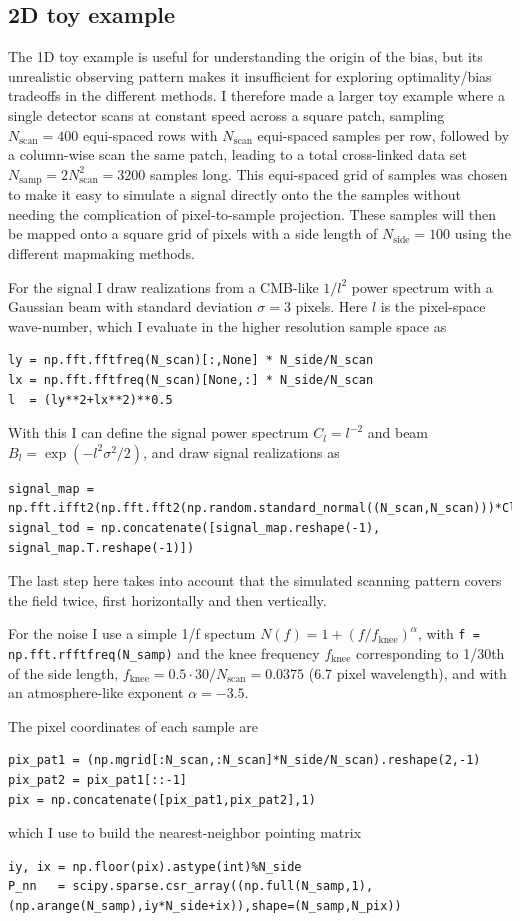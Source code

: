 \documentclass[twocolumn,apj]{aastex63}
\begin{document}
\subsection{2D toy example}
\label{sec:toy-2d}
The 1D toy example is useful for understanding the origin of the bias, but
its unrealistic observing pattern makes it insufficient for exploring
optimality/bias tradeoffs in the different methods. I therefore made a larger
toy example where a single detector scans at constant speed across a square
patch, sampling $N_\text{scan} = 400$ equi-spaced rows with $N_\text{scan}$
equi-spaced samples per row, followed by a column-wise scan the same patch,
leading to a total cross-linked data set $N_\text{samp} = 2 N_\text{scan}^2 = 3200$
samples long. This equi-spaced grid of samples was chosen to make it easy to
simulate a signal directly onto the the samples without needing the complication
of pixel-to-sample projection. These samples will then be mapped onto a
square grid of pixels with a side length of $N_\text{side} = 100$ using
the different mapmaking methods.

For the signal I draw realizations from a CMB-like $1/l^2$ power spectrum
with a Gaussian beam with standard deviation $\sigma=3$ pixels. Here $l$
is the pixel-space wave-number, which I evaluate in the higher
resolution sample space as
\begin{lstlisting}
ly = np.fft.fftfreq(N_scan)[:,None] * N_side/N_scan
lx = np.fft.fftfreq(N_scan)[None,:] * N_side/N_scan
l  = (ly**2+lx**2)**0.5
\end{lstlisting}
With this I can define the signal power spectrum $C_l = l^{-2}$ and beam $B_l = \exp(-l^2 \sigma^2/2)$,
and draw signal realizations as
\begin{lstlisting}
signal_map = np.fft.ifft2(np.fft.fft2(np.random.standard_normal((N_scan,N_scan)))*Cl**0.5*Bl).real
signal_tod = np.concatenate([signal_map.reshape(-1), signal_map.T.reshape(-1)])
\end{lstlisting}
The last step here takes into account that the simulated scanning pattern covers the
field twice, first horizontally and then vertically.

For the noise I use a simple 1/f spectum $N(f) = 1 + (f/f_\text{knee})^\alpha$,
with \lstinline{f = np.fft.rfftfreq(N_samp)}
and the knee frequency $f_\text{knee}$ corresponding to 1/30th of the side length,
$f_\text{knee} = 0.5\cdot 30/N_\text{scan} = 0.0375$ (6.7 pixel wavelength), and with
an atmosphere-like exponent $\alpha=-3.5$.

The pixel coordinates of each sample are
\begin{lstlisting}
pix_pat1 = (np.mgrid[:N_scan,:N_scan]*N_side/N_scan).reshape(2,-1)
pix_pat2 = pix_pat1[::-1]
pix = np.concatenate([pix_pat1,pix_pat2],1)
\end{lstlisting}
which I use to build the nearest-neighbor pointing matrix
\begin{lstlisting}
iy, ix = np.floor(pix).astype(int)%N_side
P_nn   = scipy.sparse.csr_array((np.full(N_samp,1),(np.arange(N_samp),iy*N_side+ix)),shape=(N_samp,N_pix))
\end{lstlisting}
\end{document}

